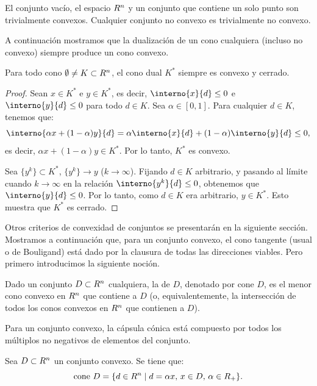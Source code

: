 El conjunto vacío, el espacio $R^n$ y un conjunto que contiene un solo punto son trivialmente convexos. Cualquier conjunto no convexo es trivialmente no convexo.

A continuación mostramos que la dualización de un cono cualquiera (incluso no convexo) siempre produce un cono convexo.

\begin{proposition}\label{v1:prop:3.1.1}
 Para todo cono $\emptyset \neq K \subset R^n$, el cono dual $K^*$ siempre es convexo y cerrado.
\end{proposition}

\begin{proof}
 Sean $x \in K^*$ e $y \in K^*$, es decir, $\interno{x}{d} \leq 0$ e $\interno{y}{d} \leq 0$ para todo $d \in K$. Sea $\alpha \in [0, 1]$. Para cualquier $d \in K$, tenemos que:
 \[
 \interno{\alpha x + (1 - \alpha)y}{d} = \alpha \interno{x}{d} + (1 - \alpha) \interno{y}{d} \leq 0,
 \]
 es decir, $\alpha x + (1 - \alpha)y \in K^*$. Por lo tanto, $K^*$ es convexo. 
 
 Sea $\{y^k\} \subset K^*$, $\{y^k\} \to y$ ($k \to \infty$). Fijando $d \in K$ arbitrario, y pasando al límite cuando $k \to \infty$ en la relación $\interno{y^k}{d} \leq 0$, obtenemos que $\interno{y}{d} \leq 0$. Por lo tanto, como $d \in K$ era arbitrario, $y \in K^*$. Esto muestra que $K^*$ es cerrado.
\end{proof}

Otros criterios de convexidad de conjuntos se presentarán en la siguiente sección. Mostramos a continuación que, para un conjunto convexo, el cono tangente (usual o de Bouligand) está dado por la clausura de todas las direcciones viables. Pero primero introducimos la siguiente noción.

\begin{definition}\label{v1:def:3.1.2}
 Dado un conjunto $D \subset R^n$ cualquiera, la  de $D$, denotado por $\text{cone } D$, es el menor cono convexo en $R^n$ que contiene a $D$ (o, equivalentemente, la intersección de todos los conos convexos en $R^n$ que contienen a $D$).
\end{definition}

Para un conjunto convexo, la cápsula cónica está compuesto por todos los múltiplos no negativos de elementos del conjunto.

\begin{proposition}\label{v1:prop:3.1.2}
 Sea $D \subset R^n$ un conjunto convexo. Se tiene que:
 \[
 \text{cone } D = \{d \in R^n \mid d = \alpha x, \, x \in D, \, \alpha \in R_+\}.
 \]
\end{proposition}

